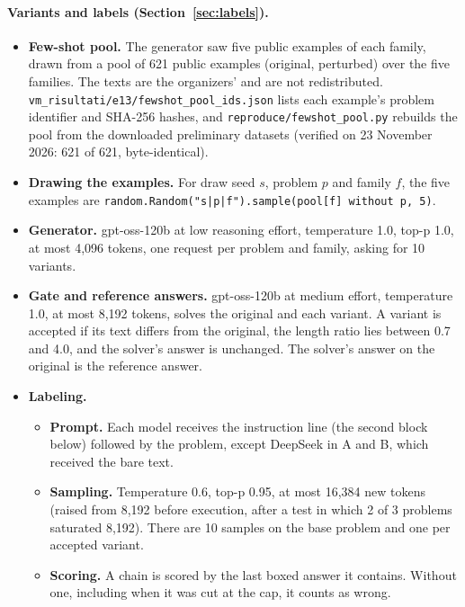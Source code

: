 \paragraph{Variants and labels (Section~\ref{sec:labels}).}
\begin{itemize}
\item \textbf{Few-shot pool.} The generator saw five public examples of each family, drawn from a pool of 621 public examples (original, perturbed) over the five families. The texts are the organizers' and are not redistributed. \texttt{vm\_risultati/e13/fewshot\_pool\_ids.json} lists each example's problem identifier and SHA-256 hashes, and \texttt{reproduce/fewshot\_pool.py} rebuilds the pool from the downloaded preliminary datasets (verified on 23 November 2026: 621 of 621, byte-identical).
\item \textbf{Drawing the examples.} For draw seed $s$, problem $p$ and family $f$, the five examples are \texttt{random.Random("s|p|f").sample(pool[f] without p, 5)}.
\item \textbf{Generator.} gpt-oss-120b at low reasoning effort, temperature 1.0, top-p 1.0, at most 4,096 tokens, one request per problem and family, asking for 10 variants.
\item \textbf{Gate and reference answers.} gpt-oss-120b at medium effort, temperature 1.0, at most 8,192 tokens, solves the original and each variant. A variant is accepted if its text differs from the original, the length ratio lies between 0.7 and 4.0, and the solver's answer is unchanged. The solver's answer on the original is the reference answer.
\item \textbf{Labeling.}
  \begin{itemize}
  \item \textbf{Prompt.} Each model receives the instruction line (the second block below) followed by the problem, except DeepSeek in A and B, which received the bare text.
  \item \textbf{Sampling.} Temperature 0.6, top-p 0.95, at most 16,384 new tokens (raised from 8,192 before execution, after a test in which 2 of 3 problems saturated 8,192). There are 10 samples on the base problem and one per accepted variant.
  \item \textbf{Scoring.} A chain is scored by the last boxed answer it contains. Without one, including when it was cut at the cap, it counts as wrong.
  \end{itemize}
\end{itemize}

